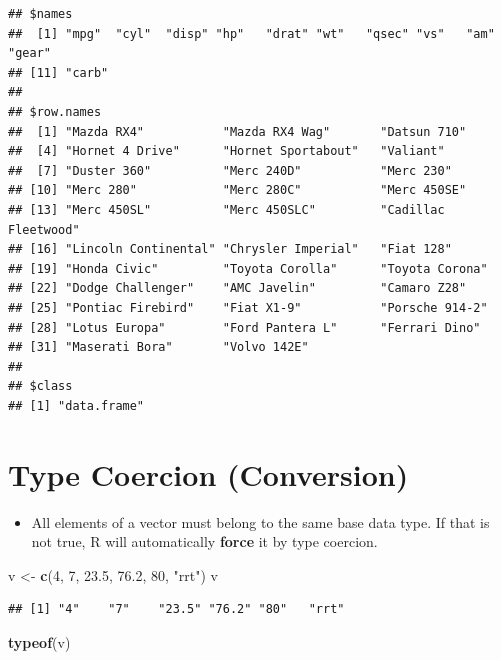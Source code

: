 \documentclass[]{book}
\newenvironment{Shaded}{\begin{snugshade}}{\end{snugshade}}
\newcommand{\KeywordTok}[1]{\textcolor[rgb]{0.13,0.29,0.53}{\textbf{{#1}}}}
\newcommand{\DecValTok}[1]{\textcolor[rgb]{0.00,0.00,0.81}{{#1}}}
\newcommand{\FloatTok}[1]{\textcolor[rgb]{0.00,0.00,0.81}{{#1}}}
\newcommand{\StringTok}[1]{\textcolor[rgb]{0.31,0.60,0.02}{{#1}}}
\newcommand{\NormalTok}[1]{{#1}}
\providecommand{\tightlist}{%
  \setlength{\itemsep}{0pt}\setlength{\parskip}{0pt}}
\begin{document}
\begin{verbatim}
## $names
##  [1] "mpg"  "cyl"  "disp" "hp"   "drat" "wt"   "qsec" "vs"   "am"   "gear"
## [11] "carb"
## 
## $row.names
##  [1] "Mazda RX4"           "Mazda RX4 Wag"       "Datsun 710"         
##  [4] "Hornet 4 Drive"      "Hornet Sportabout"   "Valiant"            
##  [7] "Duster 360"          "Merc 240D"           "Merc 230"           
## [10] "Merc 280"            "Merc 280C"           "Merc 450SE"         
## [13] "Merc 450SL"          "Merc 450SLC"         "Cadillac Fleetwood" 
## [16] "Lincoln Continental" "Chrysler Imperial"   "Fiat 128"           
## [19] "Honda Civic"         "Toyota Corolla"      "Toyota Corona"      
## [22] "Dodge Challenger"    "AMC Javelin"         "Camaro Z28"         
## [25] "Pontiac Firebird"    "Fiat X1-9"           "Porsche 914-2"      
## [28] "Lotus Europa"        "Ford Pantera L"      "Ferrari Dino"       
## [31] "Maserati Bora"       "Volvo 142E"         
## 
## $class
## [1] "data.frame"
\end{verbatim}

\section{Type Coercion (Conversion)}\label{type-coercion-conversion}

\begin{itemize}
\tightlist
\item
  All elements of a vector must belong to the same base data type. If
  that is not true, R will automatically \textbf{force} it by type
  coercion.
\end{itemize}

\begin{Shaded}
\begin{Highlighting}[]
\NormalTok{v <-}\StringTok{ }\KeywordTok{c}\NormalTok{(}\DecValTok{4}\NormalTok{, }\DecValTok{7}\NormalTok{, }\FloatTok{23.5}\NormalTok{, }\FloatTok{76.2}\NormalTok{, }\DecValTok{80}\NormalTok{, }\StringTok{"rrt"}\NormalTok{)}
\NormalTok{v}
\end{Highlighting}
\end{Shaded}

\begin{verbatim}
## [1] "4"    "7"    "23.5" "76.2" "80"   "rrt"
\end{verbatim}

\begin{Shaded}
\begin{Highlighting}[]
\KeywordTok{typeof}\NormalTok{(v)}
\end{Highlighting}
\end{Shaded}
\end{document}
